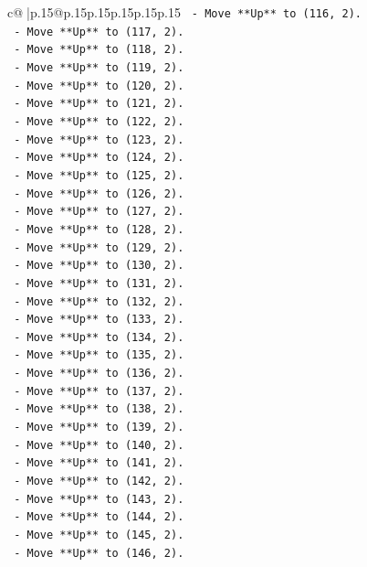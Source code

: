 \documentclass{article}
\begin{document}
{\begin{supertabular}{c@{$\;$}|p{.15\linewidth}@{}p{.15\linewidth}p{.15\linewidth}p{.15\linewidth}p{.15\linewidth}p{.15\linewidth}}
{{{\texttt{    {-} Move **Up** to (116, 2).} \\
\texttt{    {-} Move **Up** to (117, 2).} \\
\texttt{    {-} Move **Up** to (118, 2).} \\
\texttt{    {-} Move **Up** to (119, 2).} \\
\texttt{    {-} Move **Up** to (120, 2).} \\
\texttt{    {-} Move **Up** to (121, 2).} \\
\texttt{    {-} Move **Up** to (122, 2).} \\
\texttt{    {-} Move **Up** to (123, 2).} \\
\texttt{    {-} Move **Up** to (124, 2).} \\
\texttt{    {-} Move **Up** to (125, 2).} \\
\texttt{    {-} Move **Up** to (126, 2).} \\
\texttt{    {-} Move **Up** to (127, 2).} \\
\texttt{    {-} Move **Up** to (128, 2).} \\
\texttt{    {-} Move **Up** to (129, 2).} \\
\texttt{    {-} Move **Up** to (130, 2).} \\
\texttt{    {-} Move **Up** to (131, 2).} \\
\texttt{    {-} Move **Up** to (132, 2).} \\
\texttt{    {-} Move **Up** to (133, 2).} \\
\texttt{    {-} Move **Up** to (134, 2).} \\
\texttt{    {-} Move **Up** to (135, 2).} \\
\texttt{    {-} Move **Up** to (136, 2).} \\
\texttt{    {-} Move **Up** to (137, 2).} \\
\texttt{    {-} Move **Up** to (138, 2).} \\
\texttt{    {-} Move **Up** to (139, 2).} \\
\texttt{    {-} Move **Up** to (140, 2).} \\
\texttt{    {-} Move **Up** to (141, 2).} \\
\texttt{    {-} Move **Up** to (142, 2).} \\
\texttt{    {-} Move **Up** to (143, 2).} \\
\texttt{    {-} Move **Up** to (144, 2).} \\
\texttt{    {-} Move **Up** to (145, 2).} \\
\texttt{    {-} Move **Up** to (146, 2).} \\
}}}
\end{supertabular}}
\end{document}
